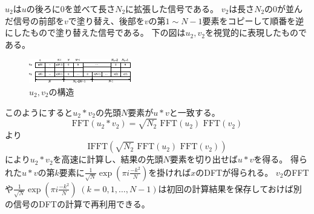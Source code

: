         $u_2$は$u$の後ろに$0$を並べて長さ$N_2$に拡張した信号である。
        $v_2$は長さ$N_2$の$0$が並んだ信号の前部を$v$で塗り替え、後部を$v$の第$1\sim N-1$要素をコピーして順番を逆にしたもので塗り替えた信号である。
        下の図は$u_2,v_2$を視覚的に表現したものである。
        \begin{figure}[H]
            \centering
            \includegraphics[keepaspectratio, scale=4]
            {parts/FourierSeries_and_FourierTransform/imgs/FFT/arbitraryLengthFFT_to_powerOf2_FFT/u2,v2.pdf}
            \caption{$u_2,v_2$の構造}
        \end{figure}
        このようにすると$u_2*v_2$の先頭$N$要素が$u*v$と一致する。
        \[ \text{FFT}(u_2*v_2) = \sqrt{N_2}\text{ FFT}(u_2) \text{ FFT}(v_2) \]
        より
        \[ \text{IFFT}(\sqrt{N_2}\text{ FFT}(u_2) \text{ FFT}(v_2)) \]
        により$u_2*v_2$を高速に計算し、結果の先頭$N$要素を切り出せば$u*v$を得る。
        得られた$u*v$の第$k$要素に$\frac{1}{\sqrt{N}} \exp \left(\pi i\frac{-k^2}{N}\right)$を掛ければ$x$のDFTが得られる。
        $v_2$のFFTや$\frac{1}{\sqrt{N}} \exp \left(\pi i\frac{-k^2}{N}\right) \;(k=0,1,\dots,N-1)$は初回の計算結果を保存しておけば別の信号のDFTの計算で再利用できる。
